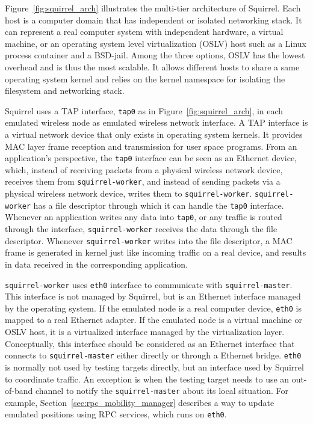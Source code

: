 \documentclass[12pt]{report}
\begin{document}
Figure~\ref{fig:squirrel_arch} illustrates the multi-tier architecture of Squirrel. Each host is a computer domain that has independent or isolated networking stack. It can represent a real computer system with independent hardware, a virtual machine, or an operating system level virtualization (OSLV) host such as a Linux process container \cite{menage2007adding} and a BSD-jail. Among the three options, OSLV has the lowest overhead and is thus the most scalable. It allows different hosts to share a same operating system kernel and relies on the kernel namespace for isolating the filesystem and networking stack.

Squirrel uses a TAP\cite{tuntap2002} interface, \texttt{tap0} as in Figure~\ref{fig:squirrel_arch}, in each emulated wireless node as emulated wireless network interface. A TAP interface is a virtual network device that only exists in operating system kernels. It provides MAC layer frame reception and transmission for user space programs. From an application's perspective, the \texttt{tap0} interface can be seen as an Ethernet device, which, instead of receiving packets from a physical wireless network device, receives them from \texttt{squirrel-worker}, and instead of sending packets via a physical wireless network device, writes them to \texttt{squirrel-worker}. \texttt{squirrel-worker} has a file descriptor through which it can handle the \texttt{tap0} interface. Whenever an application writes any data into \texttt{tap0}, or any traffic is routed through the interface, \texttt{squirrel-worker} receives the data through the file descriptor. Whenever \texttt{squirrel-worker} writes into the file descriptor, a MAC frame is generated in kernel just like incoming traffic on a real device, and results in data received in the corresponding application.

\texttt{squirrel-worker} uses \texttt{eth0} interface to communicate with \texttt{squirrel-master}. This interface is not managed by Squirrel, but is an Ethernet interface managed by the operating system. If the emulated node is a real computer device, \texttt{eth0} is mapped to a real Ethernet adapter. If the emulated node is a virtual machine or OSLV host, it is a virtualized interface managed by the virtualization layer. Conceptually, this interface should be considered as an Ethernet interface that connects to \texttt{squirrel-master} either directly or through a Ethernet bridge. \texttt{eth0} is normally not used by testing targets directly, but an interface used by Squirrel to coordinate traffic. An exception is when the testing target needs to use an out-of-band channel to notify the \texttt{squirrel-master} about its local situation. For example, Section~\ref{sec:rpc_mobility_manager} describes a way to update emulated positions using RPC services, which runs on \texttt{eth0}.
\end{document}
